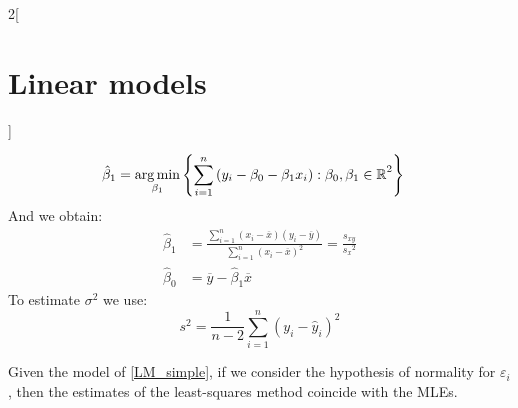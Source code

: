 \documentclass[../../../main_math.tex]{subfiles}
\begin{document}
\begin{multicols}{2}[\section{Linear models}]
\begin{proposition}
\begin{align*}
      \hat\beta_1 & =\operatorname*{arg\,min}_{\beta_1}\left\{\sum_{i=1}^n{(y_i-\beta_0-\beta_1x_i):\beta_0,\beta_1\in\mathbb{R}}^2\right\}
    \end{align*}
    And we obtain:
    \begin{align*}
      \hat\beta_1 & =\frac{\sum_{i=1}^n(x_i-\overline{x})(y_i-\overline{y})}{\sum_{i=1}^n{(x_i-\overline{x})}^2}=\frac{s_{xy}}{{s_x}^2} \\
      \hat\beta_0 & =\overline{y}-\hat\beta_1\overline{x}
    \end{align*}
    To estimate $\sigma^2$ we use: $$s^2=\frac{1}{n-2}\sum_{i=1}^n{(y_i-\hat{y}_i)}^2$$
  \end{proposition}
  \begin{theorem}
    Given the model of \cref{LM_simple}, if we consider the hypothesis of normality for $\varepsilon_i$, then the estimates of the least-squares method coincide with the MLEs.
  \end{theorem}


\end{multicols}
\end{document}
